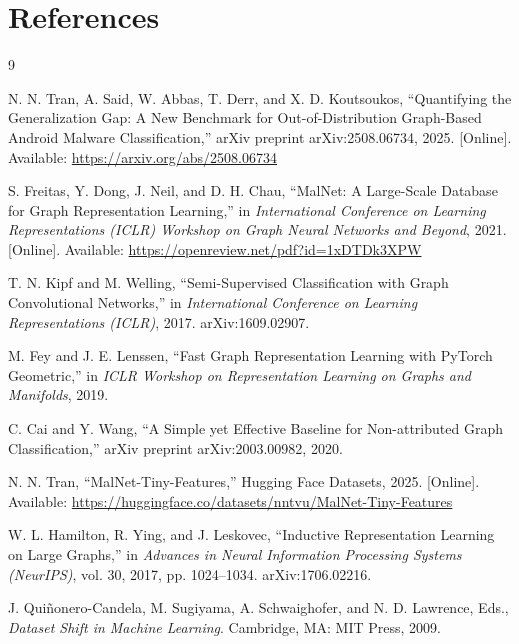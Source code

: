 \documentclass[12pt]{article}
\begin{document}
\section*{References}

\begin{thebibliography}{9}

N. N. Tran, A. Said, W. Abbas, T. Derr, and X. D. Koutsoukos,
``Quantifying the Generalization Gap: A New Benchmark for Out-of-Distribution Graph-Based Android Malware Classification,''
arXiv preprint arXiv:2508.06734, 2025. [Online]. Available: \url{https://arxiv.org/abs/2508.06734}

S. Freitas, Y. Dong, J. Neil, and D. H. Chau,
``MalNet: A Large-Scale Database for Graph Representation Learning,''
in \textit{International Conference on Learning Representations (ICLR) Workshop on Graph Neural Networks and Beyond}, 2021. [Online]. Available: \url{https://openreview.net/pdf?id=1xDTDk3XPW}

T. N. Kipf and M. Welling,
``Semi-Supervised Classification with Graph Convolutional Networks,''
in \textit{International Conference on Learning Representations (ICLR)}, 2017. arXiv:1609.02907.

M. Fey and J. E. Lenssen,
``Fast Graph Representation Learning with PyTorch Geometric,''
in \textit{ICLR Workshop on Representation Learning on Graphs and Manifolds}, 2019.

C. Cai and Y. Wang,
``A Simple yet Effective Baseline for Non-attributed Graph Classification,''
arXiv preprint arXiv:2003.00982, 2020.

N. N. Tran,
``MalNet-Tiny-Features,'' Hugging Face Datasets, 2025. [Online]. Available: \url{https://huggingface.co/datasets/nntvu/MalNet-Tiny-Features}

W. L. Hamilton, R. Ying, and J. Leskovec,
``Inductive Representation Learning on Large Graphs,''
in \textit{Advances in Neural Information Processing Systems (NeurIPS)}, vol. 30, 2017, pp. 1024--1034. arXiv:1706.02216.

J. Qui\~nonero-Candela, M. Sugiyama, A. Schwaighofer, and N. D. Lawrence, Eds.,
\textit{Dataset Shift in Machine Learning}.
Cambridge, MA: MIT Press, 2009.

\end{thebibliography}
\end{document}
